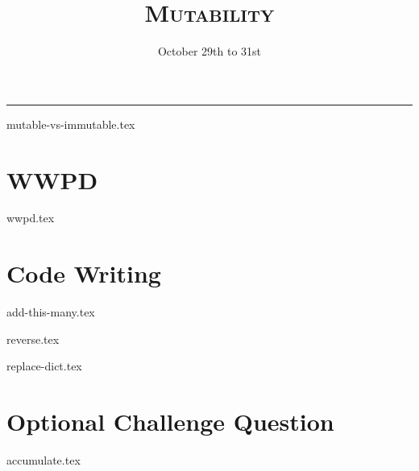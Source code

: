 \documentclass{exam}
\title{\textsc{Mutability}}
\date{October 29th to 31st}
\begin{document}
\maketitle
\rule{\textwidth}{0.15em}
\fontsize{12}{15}\selectfont


{mutable-vs-immutable.tex}
\newpage
\section{WWPD}
\begin{questions}

{wwpd.tex}
\newpage

\section{Code Writing}
{add-this-many.tex}

{reverse.tex}

{replace-dict.tex}
\newpage
\section{Optional Challenge Question}
{accumulate.tex}

\end{questions}
\end{document}
